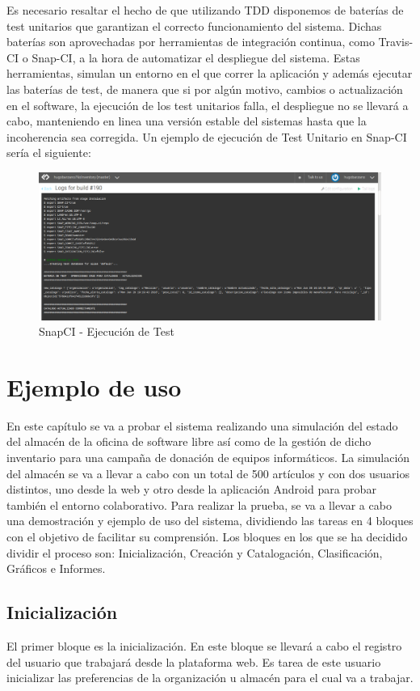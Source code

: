 \documentclass[a4paper,11pt]{book}
\begin{document}
Es necesario resaltar el hecho de que utilizando TDD disponemos de baterías de test unitarios que garantizan el correcto funcionamiento del sistema. Dichas baterías son aprovechadas por herramientas de integración continua,  como Travis-CI o Snap-CI, a la hora de automatizar el despliegue del sistema. Estas herramientas, simulan un entorno en el que correr la aplicación y además ejecutar las baterías de test, de manera que si por algún motivo, cambios o actualización en el software, la ejecución de los test unitarios falla, el despliegue no se llevará a cabo, manteniendo en linea una versión estable del sistemas hasta que la incoherencia sea corregida. Un ejemplo de ejecución de Test Unitario en Snap-CI sería el siguiente:

\begin{figure}[H] 
\centering 
\includegraphics[scale=0.35]{imagenes/pruebas/test_snap.png}
\caption{ SnapCI - Ejecución de Test\cite{propio}}
\end{figure}


\section{Ejemplo de uso}
En este capítulo se va a probar el sistema realizando una simulación del estado del almacén de la oficina de software libre así como de la gestión de dicho inventario para una campaña de donación de equipos informáticos. La simulación del almacén se va a llevar a cabo con un total de 500 artículos y con dos usuarios distintos, uno desde la web y otro desde la aplicación Android para probar también el entorno colaborativo.   Para realizar la prueba, se va a llevar a cabo una demostración y ejemplo de uso del sistema, dividiendo las tareas en 4 bloques con el objetivo de facilitar su comprensión. Los bloques en los que se ha decidido dividir el proceso son: Inicialización, Creación y Catalogación, Clasificación, Gráficos e Informes. 

\subsection{Inicialización}
El primer bloque es la inicialización. En este bloque se llevará a cabo el registro del usuario que trabajará desde la plataforma web. Es tarea de este usuario inicializar las preferencias de la organización u almacén para el cual va a trabajar. 
\end{document}
